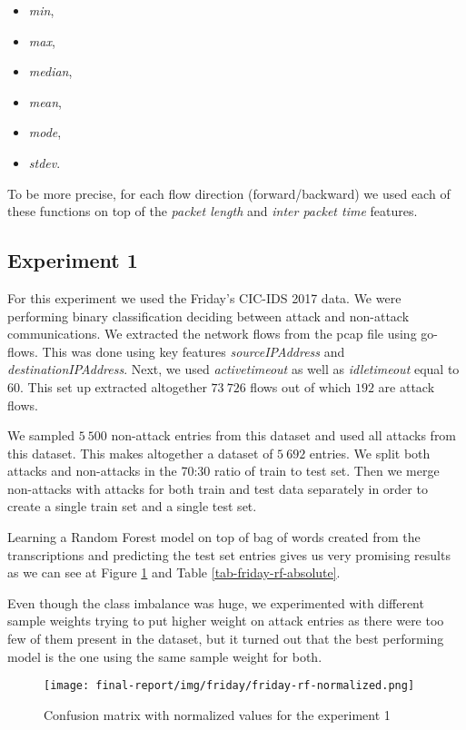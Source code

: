 \documentclass{article}
\begin{document}
\begin{itemize}
    \item \textit{min},
    \item \textit{max},
    \item \textit{median},
    \item \textit{mean},
    \item \textit{mode},
    \item \textit{stdev}.
\end{itemize}

\noindent To be more precise, for each flow direction (forward/backward) we used each of these functions on top of the \textit{packet length} and \textit{inter packet time} features.


\subsection{Experiment 1}

For this experiment we used the Friday's CIC-IDS 2017 data. We were performing binary classification deciding between attack and non-attack communications. We extracted the network flows from the pcap file using go-flows. This was done using key features \textit{sourceIPAddress} and \textit{destinationIPAddress}. Next, we used \textit{active\textunderscore timeout} as well as \textit{idle\textunderscore timeout} equal to 60. This set up extracted altogether $73\ 726$ flows out of which $192$ are attack flows.

We sampled $5\ 500$ non-attack entries from this dataset and used all attacks from this dataset. This makes altogether a dataset of $5\ 692$ entries. We split both attacks and non-attacks in the 70:30 ratio of train to test set. Then we merge non-attacks with attacks for both train and test data separately in order to create a single train set and a single test set.

Learning a Random Forest model on top of bag of words created from the transcriptions and predicting the test set entries gives us very promising results as we can see at Figure \ref{fig-friday-rf-normalized} and Table \ref{tab-friday-rf-absolute}.

Even though the class imbalance was huge, we experimented with different sample weights trying to put higher weight on attack entries as there were too few of them present in the dataset, but it turned out that the best performing model is the one using the same sample weight for both.

\begin{figure}[h!]
    \centering
    \texttt{[image: final-report/img/friday/friday-rf-normalized.png]}
    \caption{Confusion matrix with normalized values for the experiment 1}
    \label{fig-friday-rf-normalized}
\end{figure}
\end{document}
